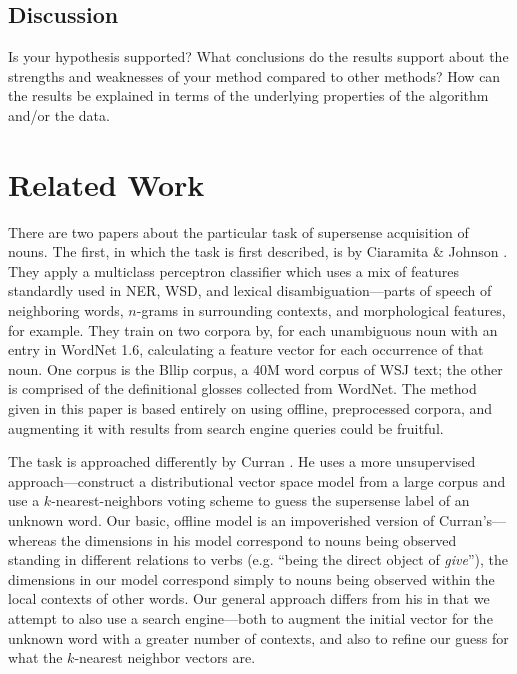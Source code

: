 \documentclass{article}
\begin{document}
\subsection{Discussion}

Is your hypothesis supported? What conclusions do the results support about the strengths and weaknesses of your method compared to other methods? How can the results be explained in terms of the underlying properties of the algorithm and/or the data. 

\section{Related Work}


There are two papers about the particular task of supersense acquisition of nouns.
The first, in which the task is first described, is by Ciaramita \& Johnson \cite{cj}.
They apply a multiclass perceptron classifier which uses a mix of features standardly used in NER, WSD, and lexical disambiguation---parts of speech of neighboring words, $n$-grams in surrounding contexts, and morphological features, for example.
They train on two corpora by, for each unambiguous noun with an entry in WordNet 1.6, calculating a feature vector for each occurrence of that noun.
One corpus is the Bllip corpus, a 40M word corpus of WSJ text; the other is comprised of the definitional glosses collected from WordNet.
The method given in this paper is based entirely on using offline, preprocessed corpora, and augmenting it with results from search engine queries could be fruitful.

The task is approached differently by Curran \cite{curran}.
He uses a more unsupervised approach---construct a distributional vector space model from a large corpus and use a $k$-nearest-neighbors voting scheme to guess the supersense label of an unknown word.
Our basic, offline model is an impoverished version of Curran's---whereas the dimensions in his model correspond to nouns being observed standing in different relations to verbs (e.g. ``being the direct object of {\it give}''), the dimensions in our model correspond simply to nouns being observed within the local contexts of other words.
Our general approach differs from his in that we attempt to also use a search engine---both to augment the initial vector for the unknown word with a greater number of contexts, and also to refine our guess for what the $k$-nearest neighbor vectors are.
\end{document}
